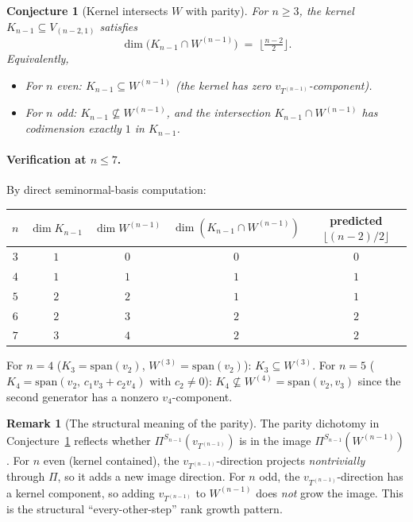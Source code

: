 \documentclass[11pt]{article}
\newtheorem{conjecture}[theorem]{Conjecture}
\theoremstyle{definition}
\newtheorem{remark}[theorem]{Remark}
\begin{document}
\begin{conjecture}[Kernel intersects $W$ with parity]\label{conj:kernel-W}
For $n \ge 3$, the kernel
$K_{n-1} \subseteq V_{(n-2,1)}$ satisfies
\[
   \dim\bigl(K_{n-1} \cap W^{(n-1)}\bigr) \;=\; \big\lfloor\tfrac{n-2}{2}\big\rfloor.
\]
Equivalently,
\begin{itemize}[topsep=0.3em,itemsep=0.2em,leftmargin=2em]
\item For $n$ \emph{even}: $K_{n-1} \subseteq W^{(n-1)}$
  (the kernel has zero $v_{T^{(n-1)}}$-component).
\item For $n$ \emph{odd}: $K_{n-1} \not\subseteq W^{(n-1)}$, and
  the intersection $K_{n-1} \cap W^{(n-1)}$ has codimension
  exactly $1$ in $K_{n-1}$.
\end{itemize}
\end{conjecture}

\paragraph{Verification at $n \le 7$.}
By direct seminormal-basis computation:
\begin{center}
\begin{tabular}{c c c c c}
\toprule
$n$ & $\dim K_{n-1}$ & $\dim W^{(n-1)}$ & $\dim(K_{n-1}\cap W^{(n-1)})$
& predicted $\lfloor(n-2)/2\rfloor$ \\
\midrule
$3$ & $1$ & $0$ & $0$ & $0$ \\
$4$ & $1$ & $1$ & $1$ & $1$ \\
$5$ & $2$ & $2$ & $1$ & $1$ \\
$6$ & $2$ & $3$ & $2$ & $2$ \\
$7$ & $3$ & $4$ & $2$ & $2$ \\
\bottomrule
\end{tabular}
\end{center}
For $n = 4$ ($K_3 = \mathrm{span}(v_2)$, $W^{(3)} = \mathrm{span}(v_2)$):
$K_3 \subseteq W^{(3)}$. \checkmark
For $n = 5$ ($K_4 = \mathrm{span}(v_2,\, c_1 v_3 + c_2 v_4)$ with
$c_2 \ne 0$): $K_4 \not\subseteq W^{(4)} = \mathrm{span}(v_2, v_3)$ since
the second generator has a nonzero $v_4$-component. \checkmark

\begin{remark}[The structural meaning of the parity]
The parity dichotomy in Conjecture~\ref{conj:kernel-W} reflects whether
$\Pi^{S_{n-1}}(v_{T^{(n-1)}})$ is in the image
$\Pi^{S_{n-1}}(W^{(n-1)})$. For $n$ even (kernel contained), the
$v_{T^{(n-1)}}$-direction projects \emph{nontrivially} through $\Pi$,
so it adds a new image direction. For $n$ odd, the
$v_{T^{(n-1)}}$-direction has a kernel component, so adding $v_{T^{(n-1)}}$
to $W^{(n-1)}$ does \emph{not} grow the image. This is the structural
``every-other-step'' rank growth pattern.
\end{remark}
\end{document}
